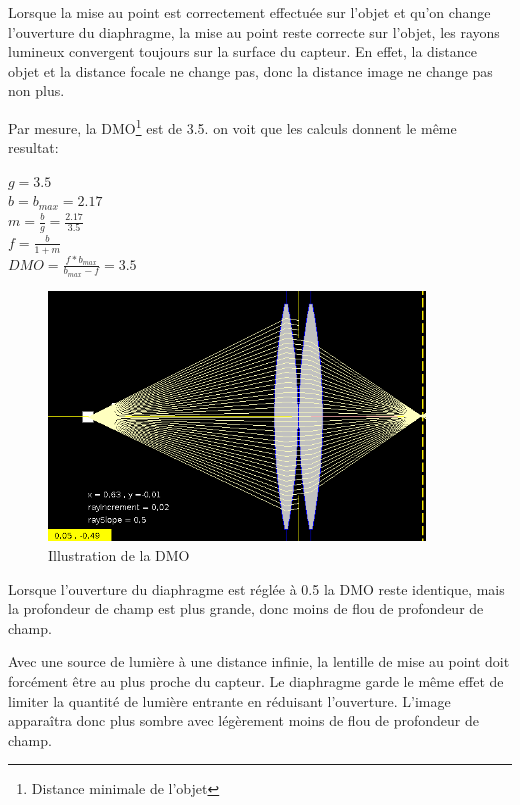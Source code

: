 Lorsque la mise au point est correctement effectuée sur l'objet et qu'on change l'ouverture du diaphragme, 
la mise au point reste correcte sur l'objet, les rayons lumineux convergent toujours sur la surface du capteur. 
En effet, la distance objet et la distance focale ne change pas, donc la distance image ne change pas non plus.\newline

Par mesure, la DMO\footnote{Distance minimale de l'objet} est de 3.5. on voit que les calculs donnent le même 
resultat:

\setlength{\columnseprule}{0.4pt}

  \begin{multicols}{3}
    \begin{flushleft}
      $g = 3.5$\\
      $b = b_{max} = 2.17$\\
      $m = \frac{b}{g} = \frac{2.17}{3.5}$\\
      $f = \frac{b}{1+m}$\\
      $DMO = \frac{f * b_{max}}{b_{max} - f} = 3.5$\\
    \end{flushleft}
  \end{multicols}

\begin{figure}[H]
      \center
      \includegraphics[width=10cm]{ressources/tp1/diaphrage.png}
      \caption{Illustration de la DMO}
\end{figure}

Lorsque l'ouverture du diaphragme est réglée à 0.5 la DMO reste identique, mais la profondeur de champ est 
plus grande, donc moins de flou de profondeur de champ.\newline

Avec une source de lumière à une distance infinie, la lentille de mise au point doit forcément être au plus proche du capteur.
Le diaphragme garde le même effet de limiter la quantité de lumière entrante en réduisant l'ouverture. L'image apparaîtra donc plus sombre avec 
légèrement moins de flou de profondeur de champ.\newline


